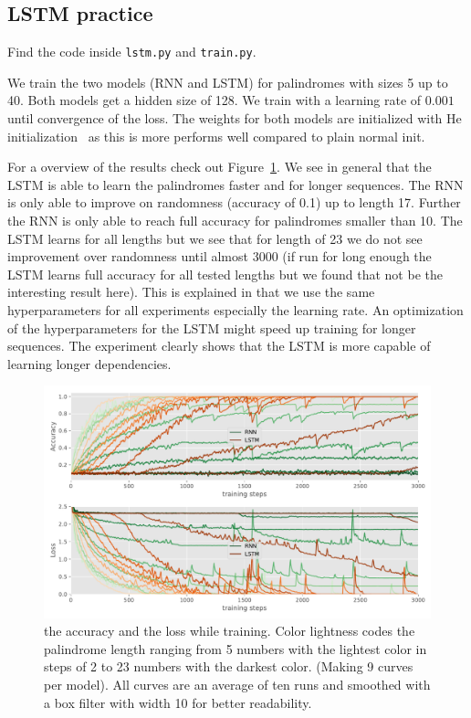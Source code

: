 \documentclass{article}
\begin{document}
\subsection{LSTM practice}\label{sub:lstm_practice}
Find the code inside \texttt{lstm.py} and \texttt{train.py}.

We train the two models (RNN and LSTM) for palindromes with sizes 5 up to 40.
Both models get a hidden size of 128.
We train with a learning rate of \(0.001\) until convergence of the loss.
The weights for both models are initialized with He initialization~\cite{he2015} as this is more performs well compared to plain normal init.

For a overview of the results check out Figure~\ref{fig:accuracy_loss}.
We see in general that the LSTM is able to learn the palindromes faster and for longer sequences.
The RNN is only able to improve on randomness (accuracy of 0.1) up to length 17.
Further the RNN is only able to reach full accuracy for palindromes smaller than 10.
The LSTM learns for all lengths but we see that for length of 23 we do not see improvement over randomness until almost 3000
(if run for long enough the LSTM learns full accuracy for all tested lengths but we found that not be the interesting result here).
This is explained in that we use the same hyperparameters for all experiments especially the learning rate.
An optimization of the hyperparameters for the LSTM might speed up training for longer sequences.
The experiment clearly shows that the LSTM is more capable of learning longer dependencies.

\begin{figure}
  \centering
  \includegraphics[width=\linewidth]{assignment_2/part1/palindrome.pdf}
  \caption{ the accuracy and  the loss while training.
  Color lightness codes the palindrome length ranging from 5 numbers with the lightest color in steps of 2 to 23 numbers with the darkest color.
  (Making 9 curves per model). All curves are an average of ten runs and smoothed with a box filter with width 10 for better readability.}\label{fig:accuracy_loss}
\end{figure}
\end{document}
